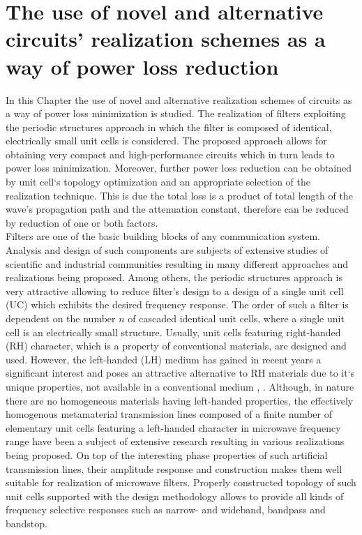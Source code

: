 \chapter{The use of novel and alternative circuits' realization schemes as a way of power loss reduction}\label{lhrh}


\indent In this Chapter the use of novel and alternative realization schemes of circuits as a way of power loss minimization is studied. The realization of filters exploiting the periodic structures approach in which the filter is composed of identical, electrically small unit cells is considered. The proposed approach allows for obtaining very compact and high-performance circuits which in turn leads to power loss minimization. Moreover, further power loss reduction can be obtained by unit cell`s topology optimization and an appropriate selection of the realization technique. This is due the total loss is a product of total length of the wave's propagation path and the attenuation constant, therefore can be reduced by reduction of one or both factors.
\\
\indent Filters are one of the basic building blocks of any communication system. Analysis and design of such components are subjects of extensive studies of scientific and industrial communities resulting in many different approaches and realizations being proposed. Among others, the periodic structures approach \cite{pozar} is very attractive allowing to reduce filter's design to a design of a single unit cell (UC) which exhibits the desired frequency response. The order of such a filter is dependent on the number $n$ of cascaded identical unit cells, where a single unit cell is an electrically small structure. Usually, unit cells featuring right-handed (RH) character, which is a property of conventional materials, are designed and used. However, the left-handed (LH) medium has gained in recent years a significant interest and poses an attractive alternative to RH materials due to it`s unique properties, not available in a conventional medium \cite{mm_lai}, \cite{caloz}. Although, in nature there are no homogeneous materials having left-handed properties, the effectively homogenous metamaterial transmission lines composed of a finite number of elementary unit cells featuring a left-handed character in microwave frequency range have been a subject of extensive research resulting in various realizations being proposed. On top of the interesting phase properties of such artificial transmission lines, their amplitude response and construction makes them well suitable for realization of microwave filters. Properly constructed topology of such unit cells supported with the design methodology allows to provide all kinds of frequency selective responses such as narrow- and wideband, bandpass and bandstop. 
